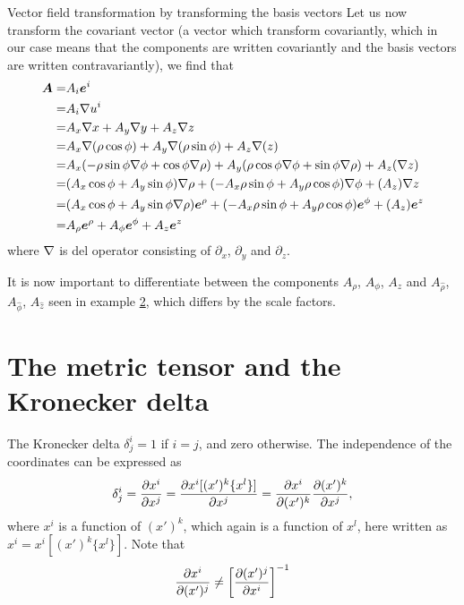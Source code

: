 \documentclass[a4paper, 12pt]{article}
\begin{document}
\begin{example}{Vector field transformation by transforming the basis vectors}
 Let us now transform the covariant vector (a vector which transform
 covariantly, which in our case means that the components are written
 covariantly and the basis vectors are  written  contravariantly), we find that
 \begin{align*}
     \boldsymbol{A}
     =& A_i\boldsymbol{e}^i\\
     =& A_i\nabla u^i\\
     =& A_x\nabla x + A_y\nabla y + A_z\nabla z\\
     =& A_x\nabla (\rho \cos\phi) + A_y\nabla (\rho \sin\phi) + A_z\nabla (z)\\
     =& A_x (-\rho \sin\phi \nabla \phi + \cos\phi \nabla \rho)
      + A_y ( \rho \cos\phi \nabla \phi + \sin\phi \nabla \rho)
      + A_z (\nabla z)\\
     =&  ( A_x\cos\phi + A_y\sin\phi)\nabla \rho
      +  (-A_x\rho \sin\phi + A_y\rho \cos\phi )\nabla \phi
      +  (A_z)\nabla z\\
     =&  ( A_x\cos\phi + A_y\sin\phi \nabla \rho)\boldsymbol{e}^\rho
      +  (-A_x\rho \sin\phi + A_y\rho \cos\phi )\boldsymbol{e}^\phi
      +  (A_z)\boldsymbol{e}^z\\
     =&  A_\rho\boldsymbol{e}^\rho
      +  A_\phi\boldsymbol{e}^\phi
      +  A_z\boldsymbol{e}^z
 \end{align*}
 where $\nabla$ is del operator consisting of $\partial_x$, $\partial_y$ and
 $\partial_z$.

 It is now important to differentiate between the components $A_\rho$,
$A_\phi$,  $A_z$ and $A_{\hat{\rho}}$, $A_{\hat{\phi}}$, $A_{\hat{z}}$ seen in
example  \hyperref[ex:vft]{2},  which differs by  the  scale factors.
\end{example}
%




\section{The metric tensor and the Kronecker delta}\label{sec:metrics}
The Kronecker delta $\delta^i_j = 1$ if $i=j$, and zero otherwise. The
independence of the coordinates can be expressed as
%
\begin{align*}
 \delta^i_j = \frac{\partial {x^i}}{\partial{x^j}} = \frac{\partial {x^i[(x')^k\{x^l\}]}}{\partial{x^j}} =
 \frac{\partial {x^i}}{\partial{(x')^k}}\frac{\partial {(x')^k}}{\partial{x^j}},
\end{align*}
%
where $x^i$ is a function of $(x')^k$, which again is a function of $x^l$, here
written as $x^i = x^i[(x')^k\{x^l\}]$. Note that
%
\begin{align*}
 \frac{\partial {x^i}}{\partial{(x')^j}} \neq \left[\frac{\partial {(x')^j}}{\partial{x^i}}\right]^{-1}
\end{align*}
\end{document}
